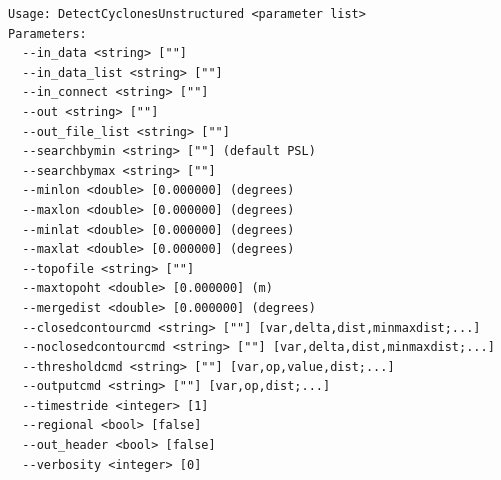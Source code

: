 \documentclass[gmdd, hvmath, online]{copernicus_discussions}
\begin{document}
{\small
\begin{verbatim}
Usage: DetectCyclonesUnstructured <parameter list>
Parameters:
  --in_data <string> [""] 
  --in_data_list <string> [""]
  --in_connect <string> [""] 
  --out <string> [""] 
  --out_file_list <string> [""]
  --searchbymin <string> [""] (default PSL)
  --searchbymax <string> [""] 
  --minlon <double> [0.000000] (degrees)
  --maxlon <double> [0.000000] (degrees)
  --minlat <double> [0.000000] (degrees)
  --maxlat <double> [0.000000] (degrees)
  --topofile <string> [""] 
  --maxtopoht <double> [0.000000] (m)
  --mergedist <double> [0.000000] (degrees)
  --closedcontourcmd <string> [""] [var,delta,dist,minmaxdist;...]
  --noclosedcontourcmd <string> [""] [var,delta,dist,minmaxdist;...]
  --thresholdcmd <string> [""] [var,op,value,dist;...]
  --outputcmd <string> [""] [var,op,dist;...]
  --timestride <integer> [1] 
  --regional <bool> [false] 
  --out_header <bool> [false] 
  --verbosity <integer> [0] 
\end{verbatim}
}
\end{document}
